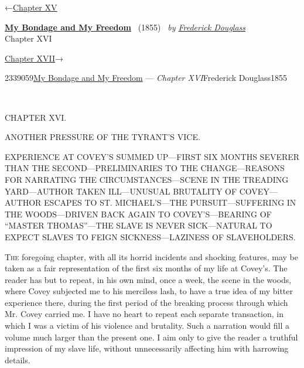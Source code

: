 \hypertarget{headerContainer}{}
\hypertarget{navigationHeader}{}
\protect\hypertarget{headerprevious}{}{←\href{/wiki/My_Bondage_and_My_Freedom_(1855)/Chapter_XV}{Chapter
XV}}

\textbf{\protect\hypertarget{header_title_text}{}{\href{/wiki/My_Bondage_and_My_Freedom_(1855)}{My
Bondage and My Freedom}}} ~(1855)~ \emph{by
\href{/wiki/Author:Frederick_Douglass}{\protect\hypertarget{header_author_text}{}{{Frederick
Douglass}}}}\\
\protect\hypertarget{header_section_text}{}{Chapter XVI}

\protect\hypertarget{headernext}{}{\href{/wiki/My_Bondage_and_My_Freedom_(1855)/Chapter_XVII}{Chapter
XVII}→}

\hypertarget{navigationNotes}{}

\hypertarget{ws-data}{}
\protect\hypertarget{ws-article-id}{}{2339059}\protect\hypertarget{ws-title}{}{\href{/wiki/My_Bondage_and_My_Freedom_(1855)}{My
Bondage and My Freedom} --- \emph{Chapter
XVI}}\protect\hypertarget{ws-author}{}{Frederick
Douglass}\protect\hypertarget{ws-year}{}{1855}

{\protect\hypertarget{222}{}{}}

~

{CHAPTER XVI.}

ANOTHER PRESSURE OF THE TYRANT'S VICE.

{EXPERIENCE AT COVEY'S SUMMED UP---FIRST SIX MONTHS SEVERER THAN THE
SECOND---PRELIMINARIES TO THE CHANGE---REASONS FOR NARRATING THE
CIRCUMSTANCES---SCENE IN THE TREADING YARD---AUTHOR TAKEN ILL---UNUSUAL
BRUTALITY OF COVEY---AUTHOR ESCAPES TO ST. MICHAEL'S---THE
PURSUIT---SUFFERING IN THE WOODS---DRIVEN BACK AGAIN TO
COVEY'S---BEARING OF ``MASTER THOMAS''---THE SLAVE IS NEVER
SICK---NATURAL TO EXPECT SLAVES TO FEIGN SICKNESS---LAZINESS OF
SLAVEHOLDERS.}

\textsc{The} foregoing chapter, with all its horrid incidents and
shocking features, may be taken as a fair representation of the first
six months of my life at Covey's. The reader has but to repeat, in his
own mind, once a week, the scene in the woods, where Covey subjected me
to his merciless lash, to have a true idea of my bitter experience
there, during the first period of the breaking process through which Mr.
Covey carried me. I have no heart to repeat each separate transaction,
in which I was a victim of his violence and brutality. Such a narration
would fill a volume much larger than the present one. I aim only to give
the reader a truthful impression of my slave life, without unnecessarily
affecting him with harrowing details.

